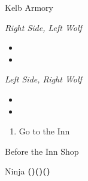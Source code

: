 \begin{paracol}{2}
\begin{shop}{Kelb Armory}
    \varwb
    \begin{sell}
        \item \goldArmor
        \item \iceBow
        \item \powerWrist
        \item \silkRobe
        \item \ether
    \end{sell}
    \begin{buy}
        \item \textit{Right Side, Left Wolf}
        \begin{itemize}
            \item {} \flameScroll \space {}
            \item {} \thunderScroll \space {}
        \end{itemize}
        \item \textit{Left Side, Right Wolf}
        \begin{itemize}
            \item {} \greenBeret \space {}
            \item {} \stealthRobe \space {}
        \end{itemize}
    \end{buy}
    \varwe
\end{shop}

\begin{enumerate}[resume]
    \item Go to the Inn
\end{enumerate}

\begin{menu}{Before the Inn Shop}
    \varwb
    \begin{jobMenu}
        \faris Ninja \textbf{(\pointLeft)(\pointDown)(\pointLeft)} \optimize
    \end{jobMenu}
    \varwe
\end{menu}


\end{paracol}
